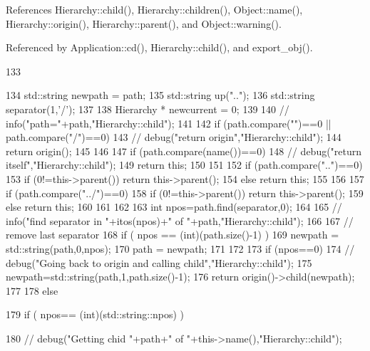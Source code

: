 References Hierarchy::child(), Hierarchy::children(), Object::name(), Hierarchy::origin(), Hierarchy::parent(), and Object::warning().

Referenced by Application::cd(), Hierarchy::child(), and export\_\-obj().


\begin{DoxyCode}
133                                          {
134   std::string newpath = path;
135   std::string up("..");
136   std::string separator(1,'/');
137 
138   Hierarchy * newcurrent = 0;
139 
140   //  info("path="+path,"Hierarchy::child");
141 
142   if (path.compare("")==0 || path.compare("/")==0) {
143     //    debug("return origin","Hierarchy::child");
144     return origin();
145   }
146 
147   if (path.compare(name())==0){
148     //    debug("return itself","Hierarchy::child");
149     return this;
150   }
151 
152   if (path.compare("..")==0){
153     if (0!=this->parent()) return this->parent();
154     else return this;
155   }
156 
157   if (path.compare("../")==0){
158     if (0!=this->parent()) return this->parent();
159     else return this;
160   }
161 
162 
163   int npos=path.find(separator,0);
164 
165   //  info("find separator in "+itos(npos)+" of "+path,"Hierarchy::child");
166 
167   // remove last separator
168   if ( npos == (int)(path.size()-1) ) {
169     newpath = std::string(path,0,npos);
170     path = newpath;
171   }
172 
173   if (npos==0){
174     //    debug("Going back to origin and calling child","Hierarchy::child");
175     newpath=std::string(path,1,path.size()-1);
176     return origin()->child(newpath);
177   }
178   else{
179     if ( npos== (int)(std::string::npos) ){
180       //      debug("Getting chid "+path+" of "+this->name(),"Hierarchy::child");
      
}}}
\end{DoxyCode}
